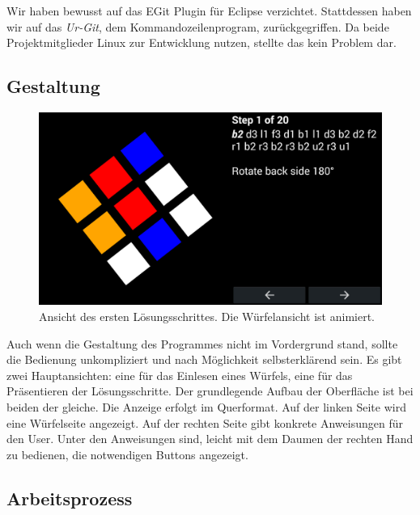Wir haben bewusst auf das EGit Plugin für Eclipse verzichtet. Stattdessen haben
wir auf das \emph{Ur-Git}, dem Kommandozeilenprogram, zurückgegriffen. Da beide
Projektmitglieder Linux zur Entwicklung nutzen, stellte das kein Problem dar.

\subsection{Gestaltung}  %

\begin{figure}[ht!]
  \centering
  \includegraphics[width=\textwidth]{pics/arcs_solving.png}
  \caption{Ansicht des ersten Lösungsschrittes. Die Würfelansicht ist animiert.}
  \label{fig:arcs_solving}
\end{figure}

Auch wenn die Gestaltung des Programmes nicht im Vordergrund stand, sollte die
Bedienung unkompliziert und nach Möglichkeit selbsterklärend sein. Es gibt zwei
Hauptansichten: eine für das Einlesen eines Würfels, eine für das Präsentieren
der Lösungsschritte. Der grundlegende Aufbau der Oberfläche ist bei beiden der
gleiche. Die Anzeige erfolgt im Querformat. Auf der linken Seite wird eine
Würfelseite angezeigt. Auf der rechten Seite gibt konkrete Anweisungen für den
User. Unter den Anweisungen sind, leicht mit dem Daumen der rechten Hand zu
bedienen, die notwendigen Buttons angezeigt.


\subsection{Arbeitsprozess}  %


